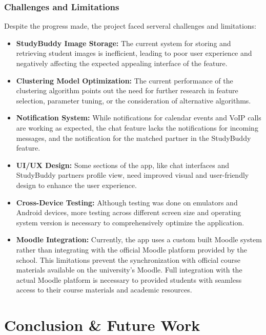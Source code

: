 \documentclass{article}
\begin{document}
\subsubsection{Challenges and Limitations}
Despite the progress made, the project faced serveral challenges and limitations:
\begin{itemize}
    \item \textbf{StudyBuddy Image Storage: } The current system for storing and retrieving student images is inefficient, leading to poor user experience and negatively affecting the expected appealing interface of the feature.
    \item \textbf{Clustering Model Optimization: } The current performance of the clustering algorithm points out the need for further research in feature selection, parameter tuning, or the consideration of alternative algorithms.
    \item \textbf{Notification System: } While notifications for calendar events and VoIP calls are working as expected, the chat feature lacks the notifications for incoming messages, and the notification for the matched partner in the StudyBuddy feature. 
    \item \textbf{UI/UX Design: } Some sections of the app, like chat interfaces and StudyBuddy partners profile view, need improved visual and user-friendly design to enhance the user experience.
    \item \textbf{Cross-Device Testing: } Although testing was done on emulators and Android devices, more testing across different screen size and operating system version is necessary to comprehensively optimize the application.
    \item \textbf{Moodle Integration: } Currently, the app uses a custom built Moodle system rather than integrating with the official Moodle platform provided by the school. This limitations prevent the synchronization with official course materials available on the university's Moodle. Full integration with the actual Moodle platform is necessary to provided students with seamless access to their course materials and academic resources.
\end{itemize}

\section{Conclusion {\&} Future Work}
\end{document}
